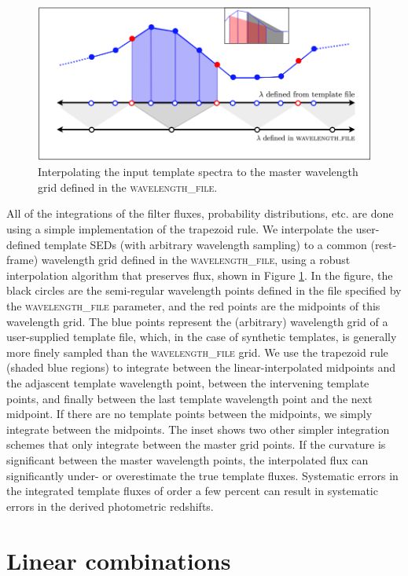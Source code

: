 \documentclass[11pt]{article}
\begin{document}
\begin{figure}
\centering
\includegraphics[width=5in]{interp.png}
\caption{Interpolating the input template spectra to the master wavelength grid
defined in the \textsc{wavelength\_file}.}
\label{fig:interp}
\end{figure}

All of the integrations of the filter fluxes, probability distributions, etc.
are done using a simple implementation of the trapezoid rule.  We interpolate
the user-defined template SEDs (with arbitrary wavelength sampling) to a common
(rest-frame) wavelength grid defined in the \textsc{wavelength\_file}, using a
robust interpolation algorithm that preserves flux, shown in Figure
\ref{fig:interp}.  In the figure,  the black circles are the semi-regular
wavelength points defined in the file specified by the \textsc{wavelength\_file}
parameter, and the red points are the midpoints of this wavelength grid.  The
blue points represent the (arbitrary) wavelength grid of a user-supplied
template file, which, in the case of synthetic templates, is generally more
finely sampled than the \textsc{wavelength\_file} grid.  We use the trapezoid
rule (shaded blue regions) to integrate between the linear-interpolated
midpoints and the adjascent template wavelength point, between the intervening
template points, and finally between the last template wavelength point and the
next midpoint.  If there are no template points between the midpoints, we simply
integrate between the midpoints. The inset shows two other simpler integration
schemes that only integrate between the master grid points.  If the curvature is
significant between the master wavelength points, the interpolated flux can
significantly under- or overestimate the true template fluxes.  Systematic
errors in the integrated template fluxes of order a few percent can result in
systematic errors in the derived photometric redshifts.


\section{Linear combinations \label{app_lincomb}}
\end{document}

